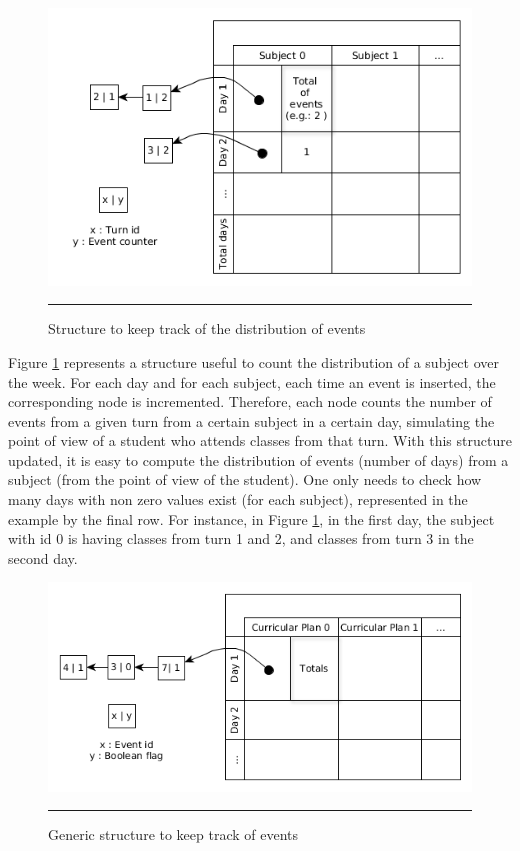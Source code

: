 \begin{figure}[t]
	\centering
	    \includegraphics[scale=0.45]{./Figures/DataStructures/yED/cp_tracking_distribution.png}
	\rule{35em}{0.5pt}
	\caption[Structure to keep track of the distribution of events]{Structure to keep track of the distribution of events} 
	\label{fig:distribution_events}
\end{figure}

Figure \ref{fig:distribution_events} represents a structure useful to count the distribution of a subject over the week. For each day and for each subject, each time an event is inserted, the corresponding node is incremented. Therefore, each node counts the number of events from a given turn from a certain subject in a certain day, simulating the point of view of a student who attends classes from that turn. With this structure updated, it is easy to compute the distribution of events (number of days) from a subject (from the point of view of the student). One only needs to check how many days with non zero values exist (for each subject), represented in the example by the final row. For instance, in Figure \ref{fig:distribution_events}, in the first day, the subject with id 0 is having classes from turn 1 and 2, and classes from turn 3 in the second day.\\

\begin{figure}[h]
	\centering
	    \includegraphics[scale=0.45]{./Figures/DataStructures/yED/cp_tracking.png}
	\rule{35em}{0.5pt}
\caption[Generic structure to keep track of events]{Generic structure to keep track of events} 
	\label{fig:tracking_cp_events}
\end{figure}

